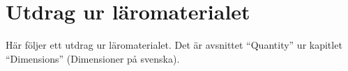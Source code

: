 \chapter{Utdrag ur läromaterialet}
\label{cha:utdrag}

Här följer ett utdrag ur läromaterialet. Det är avsnittet ``Quantity'' ur kapitlet ``Dimensions'' (Dimensioner på svenska).


